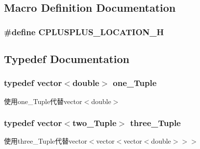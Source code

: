 \subsection{Macro Definition Documentation}
\subsubsection[{\texorpdfstring{C\+P\+L\+U\+S\+P\+L\+U\+S\+\_\+\+L\+O\+C\+A\+T\+I\+O\+N\+\_\+H}{CPLUSPLUS_LOCATION_H}}]{\setlength{\rightskip}{0pt plus 5cm}\#define C\+P\+L\+U\+S\+P\+L\+U\+S\+\_\+\+L\+O\+C\+A\+T\+I\+O\+N\+\_\+H}\hypertarget{multiloc_8txt_a2649b6521b79d3d51d2237b5dae28e7e}{}\label{multiloc_8txt_a2649b6521b79d3d51d2237b5dae28e7e}


\subsection{Typedef Documentation}
\subsubsection[{\texorpdfstring{one\+\_\+\+Tuple}{one_Tuple}}]{\setlength{\rightskip}{0pt plus 5cm}typedef vector$<$double$>$ {\bf one\+\_\+\+Tuple}}\hypertarget{multiloc_8txt_a490e31016ad1c0d99b23e323d64e3aac}{}\label{multiloc_8txt_a490e31016ad1c0d99b23e323d64e3aac}
使用one\+\_\+\+Tuple代替vector$<$double$>$ 
\subsubsection[{\texorpdfstring{three\+\_\+\+Tuple}{three_Tuple}}]{\setlength{\rightskip}{0pt plus 5cm}typedef vector$<${\bf two\+\_\+\+Tuple}$>$ {\bf three\+\_\+\+Tuple}}\hypertarget{multiloc_8txt_aa614d5a3aa93583e717bf9a9c9b6627b}{}\label{multiloc_8txt_aa614d5a3aa93583e717bf9a9c9b6627b}
使用three\+\_\+\+Tuple代替vector$<$vector$<$vector$<$double$>$$>$$>$ 
